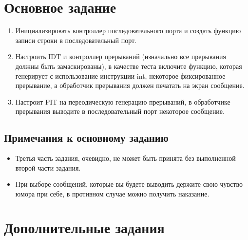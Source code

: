 \section{Основное задание}

\begin{enumerate}
  \item Инициализировать контроллер последовательного порта и создать функцию
  записи строки в последовательный порт.
  \item Настроить IDT и контроллер прерываний (изначально все прерывания должны
  быть замаскированы), в качестве теста включите функцию, которая генерирует с
  использование инструкции int, некоторое фиксированное прерывание, а обработчик
  прерывания должен печатать на экран сообщение.
  \item Настроит PIT на переодическую генерацию прерываний, в обработчике
  прерывания выводите в последовательный порт некоторое сообщение.
\end{enumerate}

\subsection{Примечания к основному заданию}

\begin{itemize}
  \item Третья часть задания, очевидно, не может быть принята без выполненной
  второй части задания.
  \item При выборе сообщений, которые вы будете выводить держите свою чувство
  юмора при себе, в противном случае можно получить наказание.
\end{itemize}

\section{Дополнительные задания}

